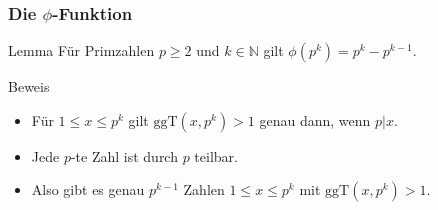 \documentclass{beamer}
\newcommand\NN{\mathbb N}
\newcommand{\ggt}{\mathrm{ggT}}
\newcommand{\ue}{\"u}
\begin{document}
\begin{frame}\frametitle{Die $\phi$-Funktion}
	\begin{block}{Lemma}
		F\ue r Primzahlen $p\geq2$ und $k\in\NN$ gilt $\phi(p^k)=p^k-p^{k-1}$.
	\end{block}
	\begin{block}{Beweis}
		\begin{itemize}
			\item F\ue r $1\leq x\leq p^k$ gilt $\ggt(x,p^k)>1$ genau dann, wenn $p|x$.
			\item Jede $p$-te Zahl ist durch $p$ teilbar.
			\item Also gibt es genau $p^{k-1}$ Zahlen $1\leq x\leq p^k$ mit $\ggt(x,p^k)>1$.
		\end{itemize}
	\end{block}
\end{frame}
\end{document}
